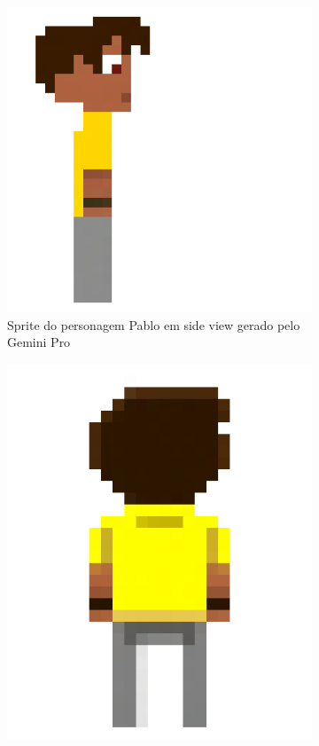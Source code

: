 \begin{figure}[htbp]
    \centering
    \caption{\small Artefatos editados no Pixel Lab}
    \label{fig:pixelLabEdicao}
    \begin{subfigure}{0.25\linewidth}
        \centering
        \includegraphics[width=1\linewidth]{figs/geminiPro/fix grande.png}
        \caption{\small Sprite do personagem Pablo em side view gerado pelo Gemini Pro}
        \label{fig:pixelLabPabloGeminiProSide}
    \end{subfigure}\hfill
    \begin{subfigure}{0.25\linewidth}
        \centering
        \includegraphics[width=0.8\linewidth]{figs/geminiPro/back_pixel_grande.png}

\end{subfigure}
\end{figure}
